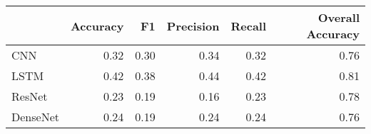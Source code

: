 \begin{tabular}{lrrrrr}
\toprule
{} &  Accuracy &    F1 &  Precision &  Recall &  Overall Accuracy \\
\midrule
CNN      &      0.32 &  0.30 &       0.34 &    0.32 &              0.76 \\
LSTM     &      0.42 &  0.38 &       0.44 &    0.42 &              0.81 \\
ResNet   &      0.23 &  0.19 &       0.16 &    0.23 &              0.78 \\
DenseNet &      0.24 &  0.19 &       0.24 &    0.24 &              0.76 \\
\bottomrule
\end{tabular}
